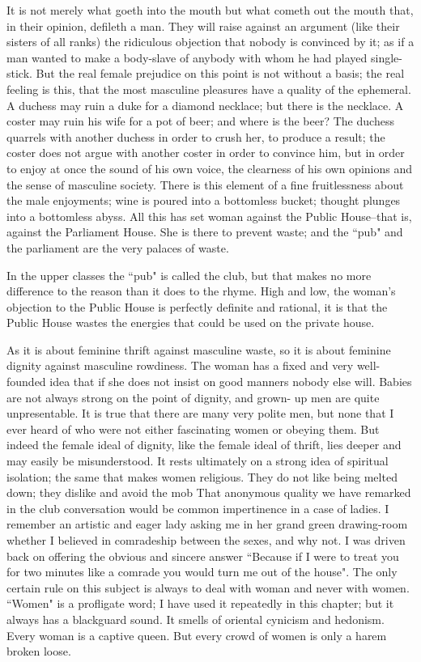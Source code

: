 \documentclass[final,10pt,letterpaper,twocolumn,openany]{book}
\begin{document}
 It is not merely what goeth into the mouth but what
cometh out the mouth that, in their opinion, defileth a man. They will raise
against an argument (like their sisters of all ranks) the ridiculous objection
that nobody is convinced by it; as if a man wanted to make a body-slave of
anybody with whom he had played single-stick. But the real female
prejudice on this point is not without a basis; the real feeling is this, that
the most masculine pleasures have a quality of the ephemeral. A duchess
may ruin a duke for a diamond necklace; but there is the necklace. A
coster may ruin his wife for a pot of beer; and where is the beer? The
duchess quarrels with another duchess in order to crush her, to produce a
result; the coster does not argue with another coster in order to convince
him, but in order to enjoy at once the sound of his own voice, the clearness
of his own opinions and the sense of masculine society. There is this
element of a fine fruitlessness about the male enjoyments; wine is poured
into a bottomless bucket; thought plunges into a bottomless abyss. All this
has set woman against the Public House--that is, against the Parliament
House. She is there to prevent waste; and the ``pub" and the parliament are
the very palaces of waste.

 In the upper classes the ``pub" is called the club,
but that makes no more difference to the reason than it does to the rhyme.
High and low, the woman's objection to the Public House is perfectly
definite and rational, it is that the Public House wastes the energies that
could be used on the private house.

As it is about feminine thrift against masculine waste, so it is about
feminine dignity against masculine rowdiness. The woman has a fixed and
very well-founded idea that if she does not insist on good manners nobody
else will. Babies are not always strong on the point of dignity, and grown-
up men are quite unpresentable. It is true that there are many very polite
men, but none that I ever heard of who were not either fascinating women
or obeying them. But indeed the female ideal of dignity, like the female
ideal of thrift, lies deeper and may easily be misunderstood. It rests
ultimately on a strong idea of spiritual isolation; the same that makes
women religious. They do not like being melted down; they dislike and
avoid the mob That anonymous quality we have remarked in the club
conversation would be common impertinence in a case of ladies. I
remember an artistic and eager lady asking me in her grand green
drawing-room whether I believed in comradeship between the sexes, and
why not. I was driven back on offering the obvious and sincere answer
``Because if I were to treat you for two minutes like a comrade you would
turn me out of the house". The only certain rule on this subject is always to
deal with woman and never with women. ``Women" is a profligate word; I
have used it repeatedly in this chapter; but it always has a blackguard
sound. It smells of oriental cynicism and hedonism. Every woman is a
captive queen. But every crowd of women is only a harem broken loose.
\end{document}
